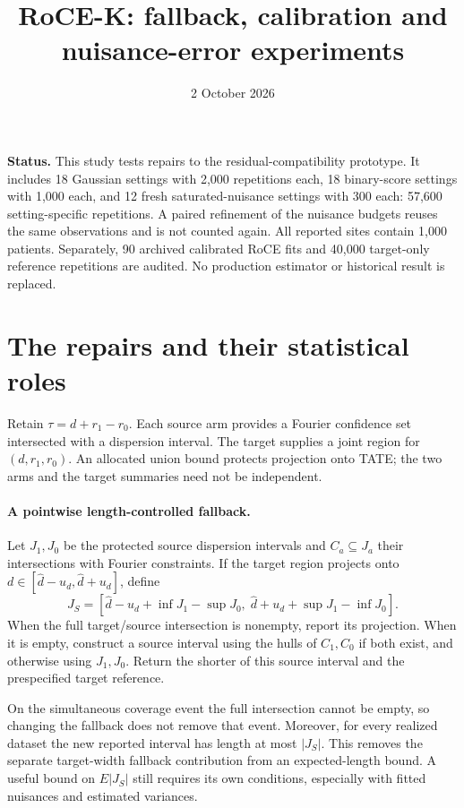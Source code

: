 \documentclass[11pt]{article}
\title{RoCE-K: fallback, calibration and nuisance-error experiments}
\author{}
\date{2 October 2026}
\begin{document}
\maketitle
\textbf{Status.} This study tests repairs to the residual-compatibility
prototype. It includes 18 Gaussian settings with 2,000 repetitions each,
18 binary-score settings with 1,000 each, and 12 fresh saturated-nuisance
settings with 300 each: 57,600 setting-specific repetitions. A paired
refinement of the nuisance budgets reuses the same observations and is not
counted again. All reported sites contain 1,000 patients. Separately, 90
archived calibrated RoCE fits and 40,000 target-only reference repetitions
are audited. No production estimator or historical result is replaced.

\section{The repairs and their statistical roles}

Retain $\tau=d+r_1-r_0$. Each source arm provides a Fourier confidence set
intersected with a dispersion interval. The target supplies a joint region
for $(d,r_1,r_0)$. An allocated union bound protects projection onto TATE;
the two arms and the target summaries need not be independent.

\paragraph{A pointwise length-controlled fallback.}
Let $J_1,J_0$ be the protected source dispersion intervals and
$C_a\subseteq J_a$ their intersections with Fourier constraints. If the
target region projects onto $d\in[\widehat d-u_d,\widehat d+u_d]$, define
\[
 J_S=[\widehat d-u_d+\inf J_1-\sup J_0,\;
       \widehat d+u_d+\sup J_1-\inf J_0].
\]
When the full target/source intersection is nonempty, report its projection.
When it is empty, construct a source interval using the hulls of $C_1,C_0$
if both exist, and otherwise using $J_1,J_0$. Return the shorter of this
source interval and the prespecified target reference.

On the simultaneous coverage event the full intersection cannot be empty,
so changing the fallback does not remove that event. Moreover, for every
realized dataset the new reported interval has length at most $|J_S|$.
This removes the separate target-width fallback contribution from an
expected-length bound. A useful bound on $E|J_S|$ still requires its own
conditions, especially with fitted nuisances and estimated variances.
\end{document}
